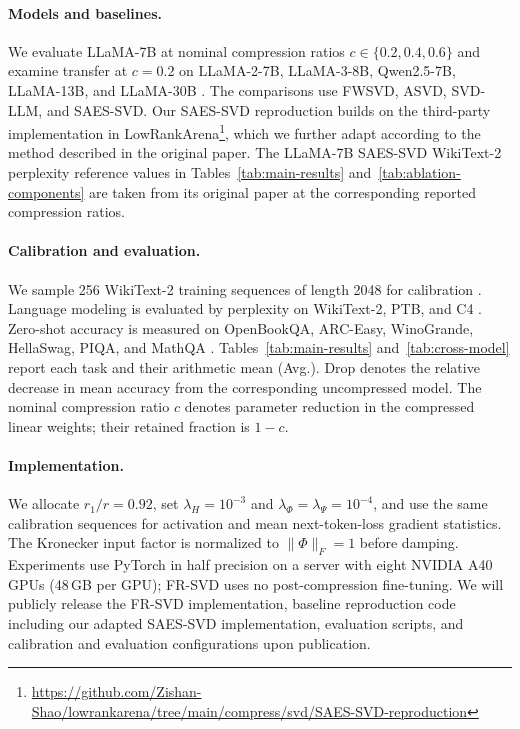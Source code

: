 \documentclass[11pt]{article}
\begin{document}
\paragraph{Models and baselines.}
We evaluate LLaMA-7B at nominal compression ratios $c\in\{0.2,0.4,0.6\}$ and examine transfer at $c=0.2$ on LLaMA-2-7B, LLaMA-3-8B, Qwen2.5-7B, LLaMA-13B, and LLaMA-30B \citep{touvron2023llama,touvron2023llama2,dubey2024llama3,yang2024qwen25}. The comparisons use FWSVD, ASVD, SVD-LLM, and SAES-SVD. Our SAES-SVD reproduction builds on the third-party implementation in LowRankArena\footnote{\url{https://github.com/Zishan-Shao/lowrankarena/tree/main/compress/svd/SAES-SVD-reproduction}}, which we further adapt according to the method described in the original paper. The LLaMA-7B SAES-SVD WikiText-2 perplexity reference values in Tables~\ref{tab:main-results} and~\ref{tab:ablation-components} are taken from its original paper at the corresponding reported compression ratios.

\paragraph{Calibration and evaluation.}
We sample 256 WikiText-2 training sequences of length 2048 for calibration \citep{merity2017wikitext2}. Language modeling is evaluated by perplexity on WikiText-2, PTB, and C4 \citep{marcus1993ptb,raffel2020c4}. Zero-shot accuracy is measured on OpenBookQA, ARC-Easy, WinoGrande, HellaSwag, PIQA, and MathQA \citep{mihaylov2018openbook,clark2018think,sakaguchi2021winogrande,zellers2019hellaswag,bisk2020piqa,amini2019mathqa}. Tables~\ref{tab:main-results} and~\ref{tab:cross-model} report each task and their arithmetic mean (Avg.). Drop denotes the relative decrease in mean accuracy from the corresponding uncompressed model. The nominal compression ratio $c$ denotes parameter reduction in the compressed linear weights; their retained fraction is $1-c$.

\paragraph{Implementation.}
We allocate $r_1/r=0.92$, set $\lambda_H=10^{-3}$ and $\lambda_\Phi=\lambda_\Psi=10^{-4}$, and use the same calibration sequences for activation and mean next-token-loss gradient statistics. The Kronecker input factor is normalized to $\|\Phi\|_F=1$ before damping. Experiments use PyTorch in half precision on a server with eight NVIDIA A40 GPUs (48\,GB per GPU); FR-SVD uses no post-compression fine-tuning. We will publicly release the FR-SVD implementation, baseline reproduction code including our adapted SAES-SVD implementation, evaluation scripts, and calibration and evaluation configurations upon publication.
\end{document}
